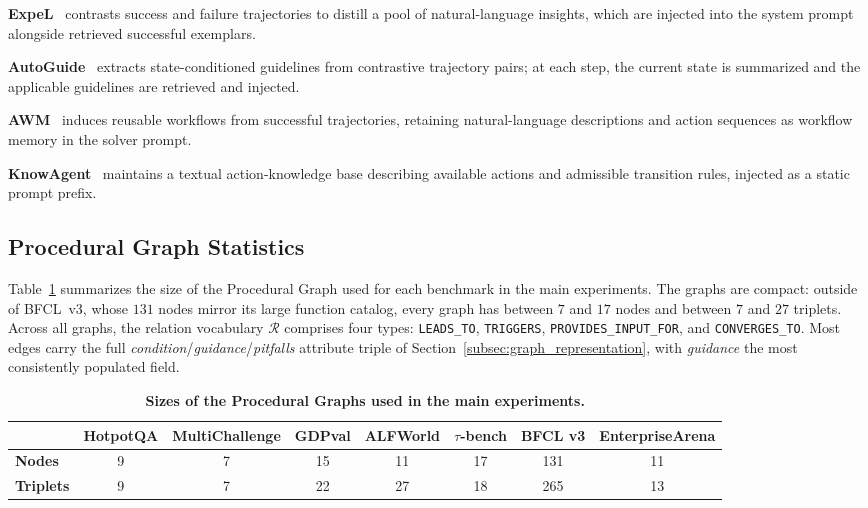 \textbf{ExpeL}~\citep{zhao2024expel} contrasts success and failure trajectories to distill a pool of natural-language insights, which are injected into the system prompt alongside retrieved successful exemplars.

\textbf{AutoGuide}~\citep{fu2024autoguide} extracts state-conditioned guidelines from contrastive trajectory pairs; at each step, the current state is summarized and the applicable guidelines are retrieved and injected.

\textbf{AWM}~\citep{wang2025agent} induces reusable workflows from successful trajectories, retaining natural-language descriptions and action sequences as workflow memory in the solver prompt.

\textbf{KnowAgent}~\citep{zhu2025knowagent} maintains a textual action-knowledge base describing available actions and admissible transition rules, injected as a static prompt prefix.

\subsection{Procedural Graph Statistics}
\label{app:pg_stats}

Table~\ref{tab:pg_stats} summarizes the size of the Procedural Graph used for each benchmark in the main experiments. The graphs are compact: outside of BFCL~v3, whose $131$ nodes mirror its large function catalog, every graph has between $7$ and $17$ nodes and between $7$ and $27$ triplets. Across all graphs, the relation vocabulary $\mathcal{R}$ comprises four types: \texttt{LEADS\_TO}, \texttt{TRIGGERS}, \texttt{PROVIDES\_INPUT\_FOR}, and \texttt{CONVERGES\_TO}. Most edges carry the full \emph{condition}/\emph{guidance}/\emph{pitfalls} attribute triple of Section~\ref{subsec:graph_representation}, with \emph{guidance} the most consistently populated field.

\begin{table}[htbp]
\centering
\footnotesize
\setlength{\aboverulesep}{0pt}
\setlength{\belowrulesep}{0pt}
\renewcommand{\arraystretch}{1.2}
\setlength{\tabcolsep}{8pt}
\caption{\textbf{Sizes of the Procedural Graphs used in the main experiments.}}
\label{tab:pg_stats}
\begin{tabular}{l ccccccc}
\toprule
\rowcolor{GoogleGreen!15}
 & \textbf{HotpotQA} & \textbf{MultiChallenge} & \textbf{GDPval} & \textbf{ALFWorld} & \textbf{$\tau$-bench} & \textbf{BFCL v3} & \textbf{EnterpriseArena} \\
\midrule
\textbf{Nodes}    & 9 & 7 & 15 & 11 & 17 & 131 & 11 \\
\textbf{Triplets} & 9 & 7 & 22 & 27 & 18 & 265 & 13 \\
\bottomrule
\end{tabular}
\end{table}

